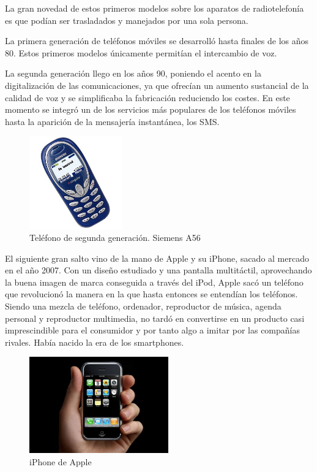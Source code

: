 La gran novedad de estos primeros modelos sobre los aparatos de radiotelefonía es que podían ser trasladados y manejados por una sola persona.

La primera generación de teléfonos móviles se desarrolló hasta finales de los años 80. Estos primeros modelos únicamente permitían el intercambio de voz.

La segunda generación llego en los años 90, poniendo el acento en la digitalización de las comunicaciones, ya que ofrecían un aumento sustancial de la calidad de voz y se simplificaba la fabricación reduciendo los costes. En este momento se integró un de los servicios más populares de los teléfonos móviles hasta la aparición de la mensajería instantánea, los \ac{SMS}.

\begin{figure}[h!btp]
\centering
\includegraphics[height=40mm, fbox={\fboxrule} 4mm]{images/03-antecedentes/29-siemens_a56.jpg}
\caption{Teléfono de segunda generación. Siemens A56}
\label{fig:siemens-a56}
\end{figure}

El siguiente gran salto vino de la mano de Apple y su iPhone, sacado al mercado en el año 2007. Con un diseño estudiado y una pantalla multitáctil, aprovechando la buena imagen de marca conseguida a través del iPod, Apple sacó un teléfono que revolucionó la manera en la que hasta entonces se entendían los teléfonos. Siendo una mezcla de teléfono, ordenador, reproductor de música, agenda personal y reproductor multimedia, no tardó en convertirse en un producto casi imprescindible para el consumidor y por tanto algo a imitar por las compañías rivales. Había nacido la era de los smartphones.

\begin{figure}[h!btp]
\centering
\includegraphics[width=60mm, fbox={\fboxrule} 4mm]{images/03-antecedentes/30-iphone.jpg}
\caption{iPhone de Apple}
\label{fig:iphone}
\end{figure}

